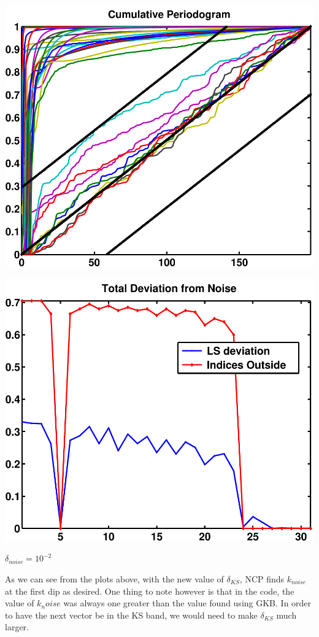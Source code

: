 \documentclass[11pt]{amsart}
\begin{document}
	\vspace{5mm}
	\begin{minipage}[t]{0.5\textwidth}
	
		\includegraphics[width=.95\linewidth]{figures/run4/cum_per} 
   
	\end{minipage}
	\begin{minipage}[t]{0.5\textwidth}
	
		\includegraphics[width=.95\linewidth]{figures/run4/total_deviation} 
   
	\end{minipage}
		\vspace{5mm}
		{\centering $\delta_{noise}=10^{-2}$}
	
As we can see from the plots above, with the new value of $\delta_{KS}$, NCP finds $k_{noise}$
at the first dip as desired. One thing to note however is that in the code, the value of $k_noise$
was always one greater than the value found using GKB. In order to have the next vector be in the
KS band, we would need to make $\delta_{KS}$ much larger.
\end{document}
